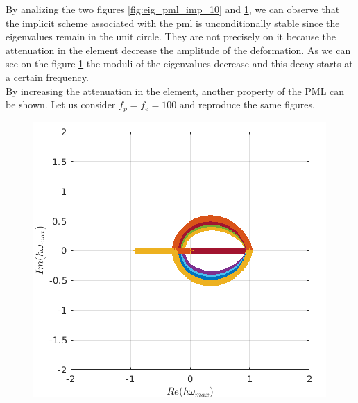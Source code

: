 \begin{itemize}
\begin{figure}[H]
\begin{minipage}{.5\textwidth}
  \label{fig:spect_rad_pml_imp_10}
\end{minipage}
\end{figure} 
By analizing the two figures \ref{fig:eig_pml_imp_10} and \ref{fig:spect_rad_pml_imp_10}, we can observe that the implicit scheme associated with the pml is unconditionally stable since the eigenvalues remain in the unit circle. They are not precisely on it because the attenuation in the element decrease the amplitude of the deformation. As we can see on the figure \ref{fig:spect_rad_pml_imp_10} the moduli of the eigenvalues decrease and this decay starts at a certain frequency.\\
By increasing the attenuation in the element, another property of the PML can be shown. Let us consider $f_p = f_e = 100$ and reproduce the same figures. 
\begin{figure}[H]
\centering
\begin{minipage}{.5\textwidth}
  \centering
  \includegraphics[width=1.\linewidth]{images/eig_pml_imp_100.png}
  \label{fig:eig_pml_imp_100}
\end{minipage}%
\begin{minipage}{.5\textwidth}
  \centering

\end{minipage}
\end{figure}
\end{itemize}
